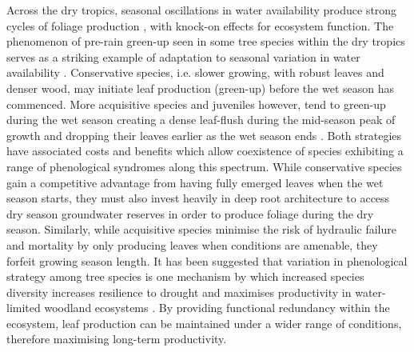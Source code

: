 \begin{refsection}
Across the dry tropics, seasonal oscillations in water availability produce strong cycles of foliage production \citep{Chidumayo2001, Dahlin2016}, with knock-on effects for ecosystem function. The phenomenon of pre-rain green-up seen in some tree species within the dry tropics serves as a striking example of adaptation to seasonal variation in water availability \citep{Ryan2017}. Conservative species, i.e. slower growing, with robust leaves and denser wood, may initiate leaf production (green-up) before the wet season has commenced. More acquisitive species and juveniles however, tend to green-up during the wet season creating a dense leaf-flush during the mid-season peak of growth and dropping their leaves earlier as the wet season ends \citep{Lasky2016}. Both strategies have associated costs and benefits which allow coexistence of species exhibiting a range of phenological syndromes along this spectrum. While conservative species gain a competitive advantage from having fully emerged leaves when the wet season starts, they must also invest heavily in deep root architecture to access dry season groundwater reserves in order to produce foliage during the dry season. Similarly, while acquisitive species minimise the risk of hydraulic failure and mortality by only producing leaves when conditions are amenable, they forfeit growing season length. It has been suggested that variation in phenological strategy among tree species is one mechanism by which increased species diversity increases resilience to drought and maximises productivity in water-limited woodland ecosystems \citep{Stan2019, Morellato2016}. By providing functional redundancy within the ecosystem, leaf production can be maintained under a wider range of conditions, therefore maximising long-term productivity.


\end{refsection}
